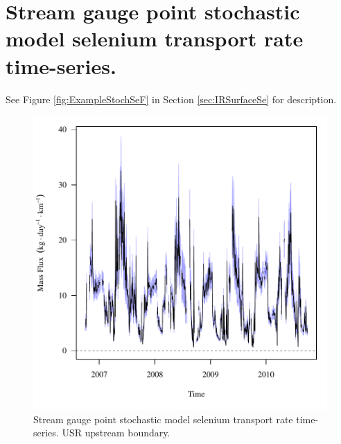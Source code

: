 \section{Stream gauge point stochastic model selenium transport rate time-series.}
\label{App:SeF-S}

See Figure \ref{fig:ExampleStochSeF} in Section \ref{sec:IRSurfaceSe} for description.

\begin{figure}[htbp]
	\begin{center}
	\includegraphics[width=6in]{"Figures/Results_USR/f U163"}
	\caption{Stream gauge point stochastic model selenium transport rate time-series.  USR upstream boundary.}
	\end{center}
\end{figure}
\newpage

